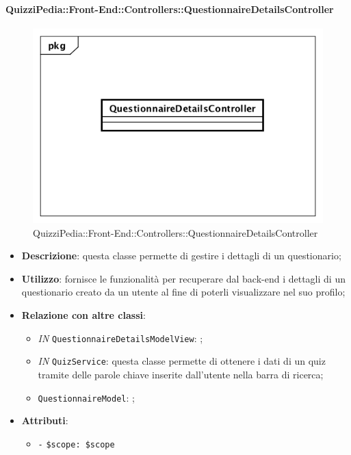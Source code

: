 \begin{itemize}
\paragraph{QuizziPedia::Front-End::Controllers::QuestionnaireDetailsController}
\begin{figure} [ht]
	\centering
	\includegraphics[scale=0.45]{UML/Classi/Front-End/QuizziPedia_Front-end_Controller_QuestionnaireDetailsController.png}
	\caption{QuizziPedia::Front-End::Controllers::QuestionnaireDetailsController}
\end{figure} \FloatBarrier
\begin{itemize}
	\item \textbf{Descrizione}: questa classe permette di gestire i dettagli di un questionario; 
	\item \textbf{Utilizzo}: fornisce le funzionalità per recuperare dal back-end i dettagli di un questionario creato da un utente al fine di poterli visualizzare nel suo profilo;
	\item \textbf{Relazione con altre classi}:
	\begin{itemize}
		\item \textit{IN} \texttt{QuestionnaireDetailsModelView}: ;
		\item \textit{IN} \texttt{QuizService}: questa classe permette di ottenere i dati di un quiz tramite delle parole chiave inserite dall'utente nella barra di ricerca;
		\item \textit{} \texttt{QuestionnaireModel}: ;
	\end{itemize}
	\item \textbf{Attributi}:
	\begin{itemize}
		\item \texttt{-} \texttt{\$scope: \$scope} \\

\end{itemize}
\end{itemize}
\end{itemize}
